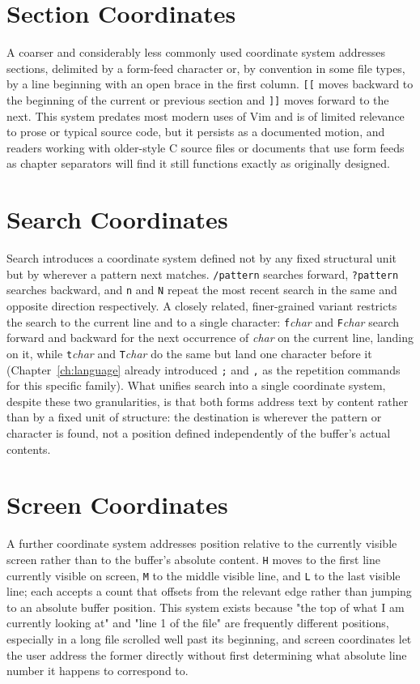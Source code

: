 \section{Section Coordinates}

A coarser and considerably less commonly used coordinate system addresses sections, delimited by a form-feed character or, by convention in some file types, by a line beginning with an open brace in the first column. \texttt{[[} moves backward to the beginning of the current or previous section and \texttt{]]} moves forward to the next. This system predates most modern uses of Vim and is of limited relevance to prose or typical source code, but it persists as a documented motion, and readers working with older-style C source files or documents that use form feeds as chapter separators will find it still functions exactly as originally designed.

\section{Search Coordinates}

Search introduces a coordinate system defined not by any fixed structural unit but by wherever a pattern next matches. \texttt{/pattern} searches forward, \texttt{?pattern} searches backward, and \texttt{n} and \texttt{N} repeat the most recent search in the same and opposite direction respectively. A closely related, finer-grained variant restricts the search to the current line and to a single character: \texttt{f}\textit{char} and \texttt{F}\textit{char} search forward and backward for the next occurrence of \textit{char} on the current line, landing on it, while \texttt{t}\textit{char} and \texttt{T}\textit{char} do the same but land one character before it (Chapter~\ref{ch:language} already introduced \texttt{;} and \texttt{,} as the repetition commands for this specific family). What unifies search into a single coordinate system, despite these two granularities, is that both forms address text by content rather than by a fixed unit of structure: the destination is wherever the pattern or character is found, not a position defined independently of the buffer's actual contents.

\section{Screen Coordinates}

A further coordinate system addresses position relative to the currently visible screen rather than to the buffer's absolute content. \texttt{H} moves to the first line currently visible on screen, \texttt{M} to the middle visible line, and \texttt{L} to the last visible line; each accepts a count that offsets from the relevant edge rather than jumping to an absolute buffer position. This system exists because "the top of what I am currently looking at" and "line 1 of the file" are frequently different positions, especially in a long file scrolled well past its beginning, and screen coordinates let the user address the former directly without first determining what absolute line number it happens to correspond to.

